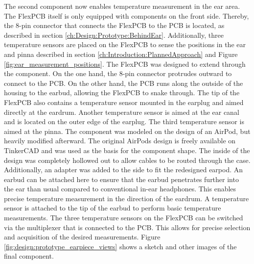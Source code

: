 The second component now enables temperature measurement in the ear area. The FlexPCB itself is only equipped with components on the front side. Thereby, the 8-pin connector that connects the FlexPCB to the PCB is located, as described in section \ref{ch:Design:Prototype:BehindEar}. Additionally, three temperature sensors are placed on the FlexPCB to sense the positions in the ear and pinna described in section \ref{ch:Introduction:PlannedApproach} and Figure \ref{fig:ear_measurement_positions}.
The FlexPCB was designed to extend through the component. On the one hand, the 8-pin connector protrudes outward to connect to the PCB. On the other hand, the PCB runs along the outside of the housing to the earbud, allowing the FlexPCB to snake through. The tip of the FlexPCB also contains a temperature sensor mounted in the earplug and aimed directly at the eardrum. Another temperature sensor is aimed at the ear canal and is located on the outer edge of the earplug. The third temperature sensor is aimed at the pinna.
The component was modeled on the design of an AirPod, but heavily modified afterward. The original AirPods design is freely available on TinkerCAD and was used as the basis for the component shape. The inside of the design was completely hollowed out to allow cables to be routed through the case. Additionally, an adapter was added to the side to fit the redesigned earpod. An earbud can be attached here to ensure that the earbud penetrates further into the ear than usual compared to conventional in-ear headphones. This enables precise temperature measurement in the direction of the eardrum. A temperature sensor is attached to the tip of the earbud to perform basic temperature measurements.
The three temperature sensors on the FlexPCB can be switched via the multiplexer that is connected to the PCB. This allows for precise selection and acquisition of the desired measurements. Figure \ref{fig:design:prototype_earpiece_views} shows a sketch and other images of the final component.

